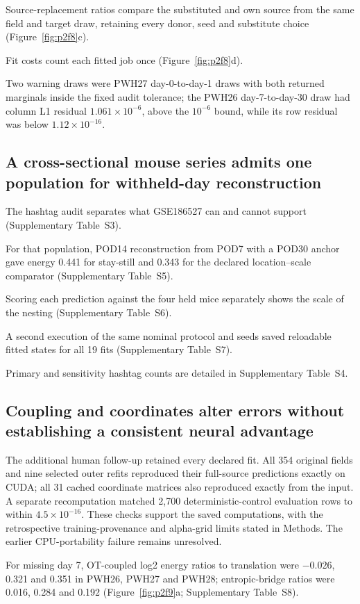 \documentclass[10pt,a4paper]{article}
\begin{document}
Source-replacement ratios compare the substituted and own source from the same field and target draw, retaining every donor, seed and substitute choice (Figure~\ref{fig:p2f8}c).

Fit costs count each fitted job once (Figure~\ref{fig:p2f8}d).

Two warning draws were PWH27 day-0-to-day-1 draws with both returned marginals inside the fixed audit tolerance; the PWH26 day-7-to-day-30 draw had column L1 residual $1.061\times10^{-6}$, above the $10^{-6}$ bound, while its row residual was below $1.12\times10^{-16}$.

\subsection{A cross-sectional mouse series admits one population for withheld-day reconstruction}

The hashtag audit separates what GSE186527 can and cannot support (Supplementary Table~S3).

For that population, POD14 reconstruction from POD7 with a POD30 anchor gave energy 0.441 for stay-still and 0.343 for the declared location--scale comparator (Supplementary Table~S5).

Scoring each prediction against the four held mice separately shows the scale of the nesting (Supplementary Table~S6).

A second execution of the same nominal protocol and seeds saved reloadable fitted states for all 19 fits (Supplementary Table~S7).

Primary and sensitivity hashtag counts are detailed in Supplementary Table~S4.

\subsection{Coupling and coordinates alter errors without establishing a consistent neural advantage}
The additional human follow-up retained every declared fit. All 354 original fields and nine selected outer refits reproduced their full-source predictions exactly on CUDA; all 31 cached coordinate matrices also reproduced exactly from the input. A separate recomputation matched 2,700 deterministic-control evaluation rows to within $4.5\times10^{-16}$. These checks support the saved computations, with the retrospective training-provenance and alpha-grid limits stated in Methods. The earlier CPU-portability failure remains unresolved.

For missing day 7, OT-coupled log2 energy ratios to translation were $-0.026$, 0.321 and 0.351 in PWH26, PWH27 and PWH28; entropic-bridge ratios were 0.016, 0.284 and 0.192 (Figure~\ref{fig:p2f9}a\label{call:p2f9}; Supplementary Table~S8).
\end{document}
